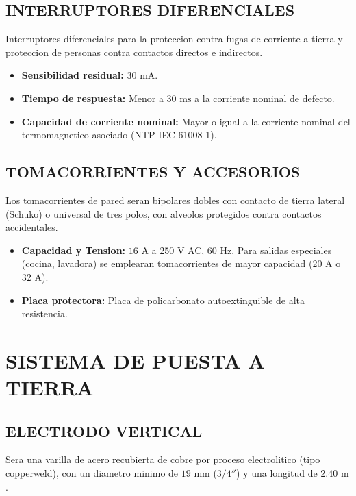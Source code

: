 \subsection{INTERRUPTORES DIFERENCIALES}
Interruptores diferenciales para la proteccion contra fugas de corriente a tierra y proteccion de personas contra contactos directos e indirectos.
\begin{itemize}
  \item \textbf{Sensibilidad residual:} \(30\text{ mA}\).
  \item \textbf{Tiempo de respuesta:} Menor a \(30\text{ ms}\) a la corriente nominal de defecto.
  \item \textbf{Capacidad de corriente nominal:} Mayor o igual a la corriente nominal del termomagnetico asociado (NTP-IEC 61008-1).
\end{itemize}

\subsection{TOMACORRIENTES Y ACCESORIOS}
Los tomacorrientes de pared seran bipolares dobles con contacto de tierra lateral (Schuko) o universal de tres polos, con alveolos protegidos contra contactos accidentales.
\begin{itemize}
  \item \textbf{Capacidad y Tension:} \(16\text{ A}\) a 250 V AC, 60 Hz. Para salidas especiales (cocina, lavadora) se emplearan tomacorrientes de mayor capacidad (20 A o 32 A).
  \item \textbf{Placa protectora:} Placa de policarbonato autoextinguible de alta resistencia.
\end{itemize}

\section{SISTEMA DE PUESTA A TIERRA}

\subsection{ELECTRODO VERTICAL}
Sera una varilla de acero recubierta de cobre por proceso electrolitico (tipo copperweld), con un diametro minimo de \(19\text{ mm}\) (\(3/4''\)) y una longitud de \(2.40\text{ m}\).


